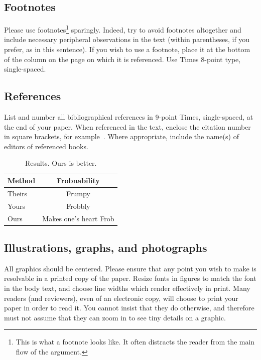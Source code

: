\documentclass[10pt,twocolumn,a4paper]{article}
\begin{document}
\subsection{Footnotes}

Please use footnotes\footnote {This is what a footnote looks like.  It
often distracts the reader from the main flow of the argument.} sparingly.
Indeed, try to avoid footnotes altogether and include necessary peripheral
observations in
the text (within parentheses, if you prefer, as in this sentence).  If you
wish to use a footnote, place it at the bottom of the column on the page on
which it is referenced. Use Times 8-point type, single-spaced.


\subsection{References}

List and number all bibliographical references in 9-point Times,
single-spaced, at the end of your paper. When referenced in the text,
enclose the citation number in square brackets, for
example~\cite{Authors14}.  Where appropriate, include the name(s) of
editors of referenced books.

\begin{table}
\begin{center}
\begin{tabular}{|l|c|}
\hline
Method & Frobnability \\
\hline\hline
Theirs & Frumpy \\
Yours & Frobbly \\
Ours & Makes one's heart Frob\\
\hline
\end{tabular}
\end{center}
\caption{Results.   Ours is better.}
\end{table}

\subsection{Illustrations, graphs, and photographs}

All graphics should be centered.  Please ensure that any point you wish to
make is resolvable in a printed copy of the paper.  Resize fonts in figures
to match the font in the body text, and choose line widths which render
effectively in print.  Many readers (and reviewers), even of an electronic
copy, will choose to print your paper in order to read it.  You cannot
insist that they do otherwise, and therefore must not assume that they can
zoom in to see tiny details on a graphic.
\end{document}

